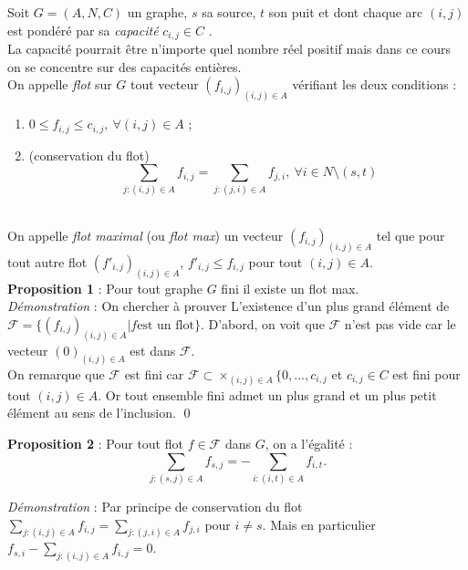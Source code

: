 \documentclass{article}[12pt]
\begin{document}
    Soit $G = (A,N,C)$ un graphe, $s$ sa source, $t$ son puit et dont chaque arc $(i,j)$ est pondéré par sa {\it capacité} $c_{i,j} \in C$ .\\ 
    La capacité pourrait être n'importe quel nombre réel positif mais dans ce cours on se concentre sur des capacités entières.\\
       
    On appelle {\it flot} sur $G$ tout vecteur $(f_{i,j})_{(i,j) \in A}$ vérifiant les deux conditions : \\
    \begin{enumerate}[label=\roman*)]
    	\item $0 \leq f_{i,j} \leq c_{i,j}, ~ \forall (i,j) \in A$ ; \\
	\item  (conservation du flot) $$ ~ \sum_{j : (i,j) \in A} f_{i,j} = \sum_{j : (j,i) \in A} f_{j,i}, ~ \forall i \in N \setminus {(s,t)}$$ \\
    \end{enumerate}
    
    On appelle {\it flot maximal} (ou {\it flot max}) un vecteur $(f_{i,j})_{(i,j)\in A}$ tel que pour tout autre flot $(f'_{i,j})_{(i,j)\in A}$, $f'_{i,j} \leq f_{i,j}$ pour tout $(i,j) \in A$.\\
    
    {\bf Proposition 1} : Pour tout graphe $G$ fini il existe un flot max. \\
    
    {\it Démonstration} : On chercher à prouver L'existence d'un plus grand élément de $\mathcal{F} = \lbrace (f_{i,j})_{(i,j) \in A} | f \text{est un flot} \rbrace$. D'abord, on voit que $\mathcal{F}$ n'est pas vide car le vecteur $(0)_{(i,j) \in A}$ est dans $\mathcal{F}$.\\
    On remarque que $\mathcal{F}$ est fini car $\mathcal{F} \subset \times_{(i,j)\in A} \lbrace 0,...,c_{i,j}$ et $c_{i,j} \in C$ est fini pour tout $(i,j) \in A$. Or tout ensemble fini admet un plus grand et un plus petit élément au sens de l'inclusion. \qed

{\bf Proposition 2} : Pour tout flot $f \in \mathcal{F}$ dans $G$, on a l'égalité : $$ \sum_{j : (s,j) \in A} f_{s,j} = -\sum_{i : (i,t) \in A} f_{i,t}. $$    
    
    {\it Démonstration} : Par principe de conservation du flot $\sum_{j : (i,j) \in A} f_{i,j} = \sum_{j : (j,i) \in A} f_{j,i}$ pour $i \ne s$. Mais en particulier $f_{s,i} - \sum_{j : (i,j) \in A} f_{i,j} = 0$. %
    
\end{document}
